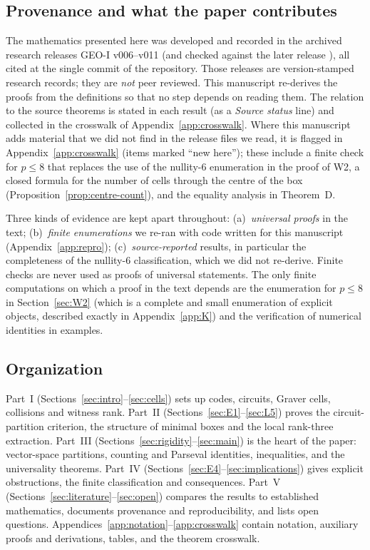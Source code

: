 \subsection{Provenance and what the paper contributes}

The mathematics presented here was developed and recorded in the archived research releases GEO-I v006--v011 \cite{GEOIv006,GEOIv007,GEOIv008,GEOIv009,GEOIv010,GEOIv011} (and checked against the later release \cite{GEOIv012}), all cited at the single commit \geoicommit{} of the repository. Those releases are version-stamped research records; they are \emph{not} peer reviewed. This manuscript re-derives the proofs from the definitions so that no step depends on reading them. The relation to the source theorems is stated in each result (as a \textit{Source status} line) and collected in the crosswalk of Appendix~\ref{app:crosswalk}. Where this manuscript adds material that we did not find in the release files we read, it is flagged in Appendix~\ref{app:crosswalk} (items marked ``new here''); these include a finite check for $p\le8$ that replaces the use of the nullity-$6$ enumeration in the proof of W2, a closed formula for the number of cells through the centre of the box (Proposition~\ref{prop:centre-count}), and the equality analysis in Theorem~D.

Three kinds of evidence are kept apart throughout: (a)~\emph{universal proofs} in the text; (b)~\emph{finite enumerations} we re-ran with code written for this manuscript (Appendix~\ref{app:repro}); (c)~\emph{source-reported} results, in particular the completeness of the nullity-$6$ classification, which we did not re-derive. Finite checks are never used as proofs of universal statements. The only finite computations on which a proof in the text depends are the enumeration for $p\le8$ in Section~\ref{sec:W2} (which is a complete and small enumeration of explicit objects, described exactly in Appendix~\ref{app:K}) and the verification of numerical identities in examples.

\subsection{Organization}

Part~I (Sections~\ref{sec:intro}--\ref{sec:cells}) sets up codes, circuits, Graver cells, collisions and witness rank. Part~II (Sections~\ref{sec:E1}--\ref{sec:L5}) proves the circuit-partition criterion, the structure of minimal boxes and the local rank-three extraction. Part~III (Sections~\ref{sec:rigidity}--\ref{sec:main}) is the heart of the paper: vector-space partitions, counting and Parseval identities, inequalities, and the universality theorems. Part~IV (Sections~\ref{sec:E4}--\ref{sec:implications}) gives explicit obstructions, the finite classification and consequences. Part~V (Sections~\ref{sec:literature}--\ref{sec:open}) compares the results to established mathematics, documents provenance and reproducibility, and lists open questions. Appendices~\ref{app:notation}--\ref{app:crosswalk} contain notation, auxiliary proofs and derivations, tables, and the theorem crosswalk.

